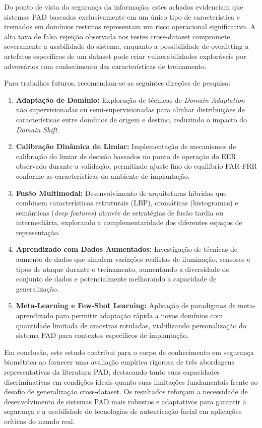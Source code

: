 \documentclass[
	article,			%
	11pt,				%
	oneside,			%
	a4paper,			%
	english,			%
	brazil,				%
	sumario=tradicional
	]{abntex2}
\begin{document}
Do ponto de vista da segurança da informação, estes achados evidenciam que sistemas PAD baseados exclusivamente em um único tipo de característica e treinados em domínios restritos representam um risco operacional significativo. A alta taxa de falsa rejeição observada nos testes cross-dataset compromete severamente a usabilidade do sistema, enquanto a possibilidade de overfitting a artefatos específicos de um dataset pode criar vulnerabilidades exploráveis por adversários com conhecimento das características de treinamento.

Para trabalhos futuros, recomendam-se as seguintes direções de pesquisa:

\begin{enumerate}
    \item \textbf{Adaptação de Domínio:} Exploração de técnicas de \textit{Domain Adaptation} não supervisionadas ou semi-supervisionadas para alinhar distribuições de características entre domínios de origem e destino, reduzindo o impacto do \textit{Domain Shift}.
    \item \textbf{Calibração Dinâmica de Limiar:} Implementação de mecanismos de calibração do limiar de decisão baseados no ponto de operação do EER observado durante a validação, permitindo ajuste fino do equilíbrio FAR-FRR conforme as características do ambiente de implantação.
    \item \textbf{Fusão Multimodal:} Desenvolvimento de arquiteturas híbridas que combinem características estruturais (LBP), cromáticas (histogramas) e semânticas (\textit{deep features}) através de estratégias de fusão tardia ou intermediária, explorando a complementaridade dos diferentes espaços de representação.
    \item \textbf{Aprendizado com Dados Aumentados:} Investigação de técnicas de aumento de dados que simulem variações realistas de iluminação, sensores e tipos de ataque durante o treinamento, aumentando a diversidade do conjunto de dados e potencialmente melhorando a capacidade de generalização.
    \item \textbf{Meta-Learning e Few-Shot Learning:} Aplicação de paradigmas de meta-aprendizado para permitir adaptação rápida a novos domínios com quantidade limitada de amostras rotuladas, viabilizando personalização do sistema PAD para contextos específicos de implantação.
\end{enumerate}

Em conclusão, este estudo contribui para o corpo de conhecimento em segurança biométrica ao fornecer uma avaliação empírica rigorosa de três abordagens representativas da literatura PAD, destacando tanto suas capacidades discriminativas em condições ideais quanto suas limitações fundamentais frente ao desafio de generalização cross-dataset. Os resultados reforçam a necessidade de desenvolvimento de sistemas PAD mais robustos e adaptativos para garantir a segurança e a usabilidade de tecnologias de autenticação facial em aplicações críticas do mundo real.
\end{document}
